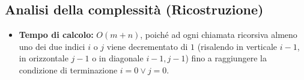 \subsection{Analisi della complessità (Ricostruzione)}
\begin{itemize}
    \item \textbf{Tempo di calcolo:} $O(m + n)$, poiché ad ogni chiamata ricorsiva almeno uno dei due indici $i$ o $j$ viene decrementato di $1$ (risalendo in verticale $i-1$, in orizzontale $j-1$ o in diagonale $i-1, j-1$) fino a raggiungere la condizione di terminazione $i = 0 \lor j = 0$.
\end{itemize}
